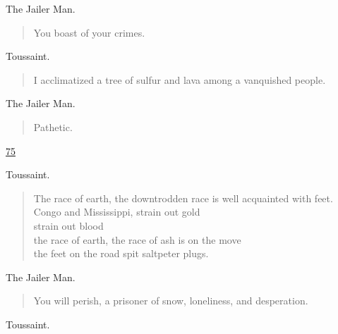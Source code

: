 \documentclass[letterpaper,article,12pt,oneside,notitlepage]{memoir}
\begin{document}
\begin{center}The Jailer Man.\end{center}

\begin{verse}
You boast of your crimes. \\
\end{verse}

\begin{center}Toussaint.\end{center}

\begin{verse}
I acclimatized a tree of sulfur and lava among a vanquished people. \\
\end{verse}

\begin{center}The Jailer Man.\end{center}

\begin{verse}
Pathetic. \\
\end{verse}


\clearpage

\href{http://cesaire.elotroalex.com/chiens/chiens/p075.html}{75}

\begin{center}Toussaint.\end{center}

\begin{verse}
The race of earth, the downtrodden race is well acquainted with feet. \\
Congo and Mississippi, strain out gold \\
strain out blood \\
the race of earth, the race of ash is on the move \\
the feet on the road spit saltpeter plugs. \\
\end{verse}

\begin{center}The Jailer Man.\end{center}

\begin{verse}
You will perish, a prisoner of snow, loneliness, and desperation. \\
\end{verse}

\begin{center}Toussaint.\end{center}
\end{document}
